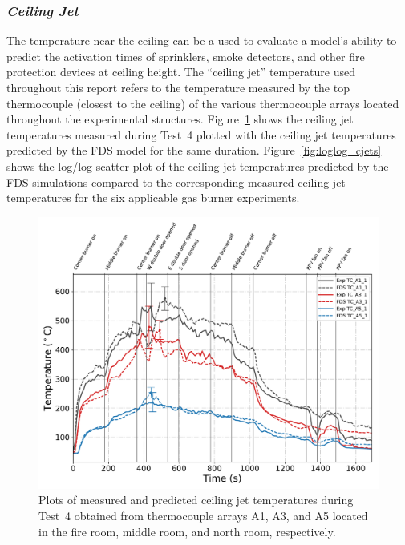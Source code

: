 \FloatBarrier
\subsubsection*{\textit{Ceiling Jet}}
The temperature near the ceiling can be a used to evaluate a model's ability to predict the activation times of sprinklers, smoke detectors, and other fire protection devices at ceiling height. The ``ceiling jet'' temperature used throughout this report refers to the temperature measured by the top thermocouple (closest to the ceiling) of the various thermocouple arrays located throughout the experimental structures. Figure~\ref{fig:cjet_data} shows the ceiling jet temperatures measured during Test~4 plotted with the ceiling jet temperatures predicted by the FDS model for the same duration. Figure~\ref{fig:loglog_cjets} shows the log/log scatter plot of the ceiling jet temperatures predicted by the FDS simulations compared to the corresponding measured ceiling jet temperatures for the six applicable gas burner experiments.
\begin{figure}[!h]
	\centering
	\includegraphics[width=\columnwidth]{Figures/Plots/Validation/Temperature/Test_4_cjet_1}
	\caption[Plots of measured and predicted ceiling jet temperatures during Test~4.]{Plots of measured and predicted ceiling jet temperatures during Test~4 obtained from thermocouple arrays A1, A3, and A5 located in the fire room, middle room, and north room, respectively.}
	\label{fig:cjet_data}
\end{figure}


